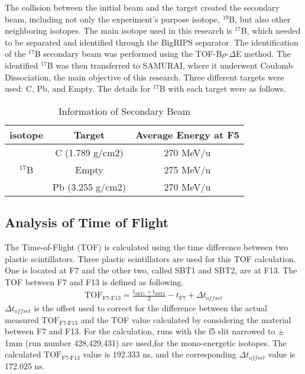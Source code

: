     \indent The collision between the initial beam and the target created the secondary beam, including not only the experiment's purpose isotope, ${}^{19}$B, but also other neighboring isotopes. The main isotope used in this research is ${}^{17}$B, which needed to be separated and identified through the BigRIPS separator. The identification of the ${}^{17}$B secondary beam was performed using the TOF-B$\rho$-$\Delta$E method. The identified ${}^{17}$B was then transferred to SAMURAI, where it underwent Coulomb Dissociation, the main objective of this research. Three different targets were used: C, Pb, and Empty. The details for ${}^{17}$B with each target were as follows.
    \begin{table}[ht]
        \centering
        \begin{tabular}[ht]{c|c|c}
            \hline
            isotope & Target & Average Energy at F5 \\
            \hline
            & C (1.789 g/cm2)  & 270 MeV/u\\
            ${}^{17}$B & Empty  & 275 MeV/u\\
            & Pb (3.255 g/cm2) & 270 MeV/u\\
            \hline    
        \end{tabular}
        \caption{Information of Secondary Beam}
    \end{table}


\subsection{Analysis of Time of Flight}
The Time-of-Flight (TOF) is calculated using the time difference between two plastic scintillators. Three plastic scintillators are used for this TOF calculation. One is located at F7 and the other two, called SBT1 and SBT2, are at F13. The TOF between F7 and F13 is defined as following.
    \begin{align}
        \text{TOF}_{\text{F7-F13}} = \frac{t_{\text{SBT1}} + t_{\text{SBT2}}}{2} - t_{\text{F7}} + \Delta t_{offset}
    \end{align}
$\Delta t_{offset}$ is the offset used to correct for the difference between the actual measured $\text{TOF}_{\text{F7-F13}}$ and the TOF value calculated by considering the material between F7 and F13. For the calculation, runs with the f5 slit narrowed to $\pm$ 1mm (run number 428,429,431) are used,for the mono-energetic isotopes. The calculated $\text{TOF}_{\text{F7-F13}}$ value is 192.333 ns, and the corresponding $\Delta t_{offset}$ value is 172.025 ns.

